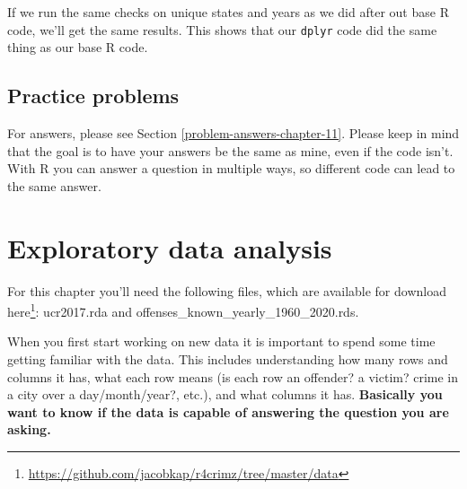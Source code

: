 \documentclass[
]{krantz}
\makeatletter
\newenvironment{Shaded}{\begin{snugshade}}{\end{snugshade}}
\newcommand{\CommentTok}[1]{\textcolor[rgb]{0.37,0.37,0.37}{\textit{#1}}}
\newcommand{\FunctionTok}[1]{\textcolor[rgb]{0,0,0}{#1}}
\newcommand{\NormalTok}[1]{#1}
\newcommand{\SpecialCharTok}[1]{\textcolor[rgb]{0,0,0}{#1}}
\renewcommand{\href}[2]{#2\footnote{\url{#1}}}
\newenvironment{kframe}{%
\medskip{}
\setlength{\fboxsep}{.8em}
 \def\at@end@of@kframe{}%
 \ifinner\ifhmode%
  \def\at@end@of@kframe{\end{minipage}}%
  \begin{minipage}{\columnwidth}%
 \fi\fi%
 \def\FrameCommand##1{\hskip\@totalleftmargin \hskip-\fboxsep
 \colorbox{shadecolor}{##1}\hskip-\fboxsep
     \hskip-\linewidth \hskip-\@totalleftmargin \hskip\columnwidth}%
 \MakeFramed {\advance\hsize-\width
   \@totalleftmargin\z@ \linewidth\hsize
   \@setminipage}}%
 {\par\unskip\endMakeFramed%
 \at@end@of@kframe}
\renewenvironment{Shaded}{\begin{kframe}}{\end{kframe}}
\makeatother
\begin{document}
If we run the same checks on unique states and years as we did after out base R code, we'll get the same results. This shows that our \texttt{dplyr} code did the same thing as our base R code.

\begin{Shaded}
\end{Shaded}

\begin{Shaded}
\end{Shaded}

\hypertarget{practice-problems-4}{%
\section{Practice problems}\label{practice-problems-4}}

For answers, please see Section \ref{problem-answers-chapter-11}. Please keep in mind that the goal is to have your answers be the same as mine, even if the code isn't. With R you can answer a question in multiple ways, so different code can lead to the same answer.

\hypertarget{explore}{%
\chapter{Exploratory data analysis}\label{explore}}

For this chapter you'll need the following files, which are available for download \href{https://github.com/jacobkap/r4crimz/tree/master/data}{here}: ucr2017.rda and offenses\_known\_yearly\_1960\_2020.rds.

When you first start working on new data it is important to spend some time getting familiar with the data. This includes understanding how many rows and columns it has, what each row means (is each row an offender? a victim? crime in a city over a day/month/year?, etc.), and what columns it has. \textbf{Basically you want to know if the data is capable of answering the question you are asking.}
\end{document}
